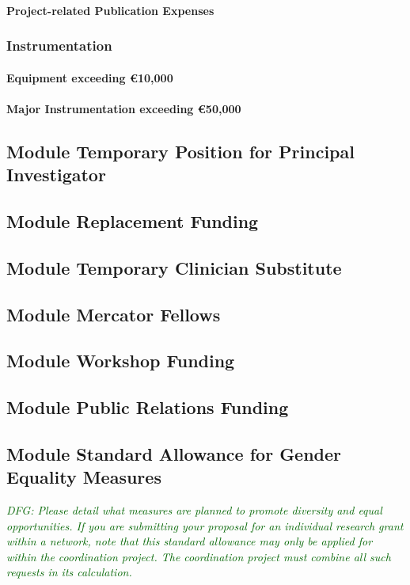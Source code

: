 \documentclass[a4paper,11pt]{amsart}
\theoremstyle{definition}
\newcommand{\<}{\langle}
\renewcommand{\>}{\rangle}
\newcommand{\dfg}[1]{\emph{\textcolor{darkgreen}{DFG: #1}}}
\begin{document}
\paragraph{Project-related Publication Expenses}


\subsubsection{Instrumentation}
\paragraph{Equipment exceeding \euro 10,000}
\paragraph{Major Instrumentation exceeding \euro 50,000}

\subsection{Module Temporary Position for Principal Investigator}
\subsection{Module Replacement Funding}
\subsection{Module Temporary Clinician Substitute}
\subsection{Module Mercator Fellows}
\subsection{Module Workshop Funding}
\subsection{Module Public Relations Funding}
\subsection{Module Standard Allowance for Gender Equality Measures}
\dfg{Please detail what measures are planned to promote diversity and
  equal opportunities.  If you are submitting your proposal for an
  individual research grant within a network, note that this standard
  allowance may only be applied for within the coordination
  project. The coordination project must combine all such requests in
  its calculation.}
\end{document}
